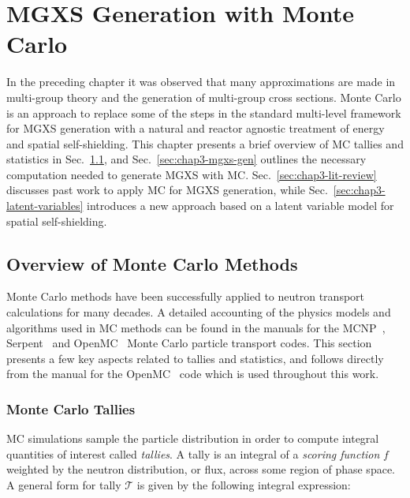 \chapter{MGXS Generation with Monte Carlo}
\label{chap:mgxs-mc}

In the preceding chapter it was observed that many approximations are made in multi-group theory and the generation of multi-group cross sections. Monte Carlo is an approach to replace some of the steps in the standard multi-level framework for \ac{MGXS} generation with a natural and reactor agnostic treatment of energy and spatial self-shielding. This chapter presents a brief overview of \ac{MC} tallies and statistics in Sec.~\ref{sec:chap3-mc-overview}, and Sec.~\ref{sec:chap3-mgxs-gen} outlines the necessary computation needed to generate \ac{MGXS} with \ac{MC}. Sec.~\ref{sec:chap3-lit-review} discusses past work to apply \ac{MC} for \ac{MGXS} generation, while Sec.~\ref{sec:chap3-latent-variables} introduces a new approach based on a latent variable model for spatial self-shielding.


\section{Overview of Monte Carlo Methods}
\label{sec:chap3-mc-overview}

Monte Carlo methods have been successfully applied to neutron transport calculations for many decades. A detailed accounting of the physics models and algorithms used in \ac{MC} methods can be found in the manuals for the MCNP~\cite{mcnpx2003manual}, Serpent~\cite{serpent2013manual} and OpenMC~\cite{openmc2016manual} Monte Carlo particle transport codes. This section presents a few key aspects related to tallies and statistics, and follows directly from the manual for the OpenMC~\cite{openmc2016manual} code which is used throughout this work.

\subsection{Monte Carlo Tallies}
\label{subsec:chap3-mc-tallies}

\ac{MC} simulations sample the particle distribution in order to compute integral quantities of interest called \textit{tallies}. A tally is an integral of a \textit{scoring function} $f$ weighted by the neutron distribution, or flux, across some region of phase space. A general form for tally $\mathcal{T}$ is given by the following integral expression:

